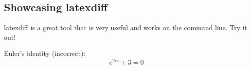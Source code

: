 \documentclass[12pt]{article}
\begin{document}
\begin{flushleft}

\section{Showcasing latexdiff}

latexdiff is a great tool that is very useful and works on the command line. Try it out! \newline

Euler's identity (incorrect):
\begin{equation}
e^{2 i \pi} + 3 = 0
\end{equation}



\end{flushleft}
\end{document}
